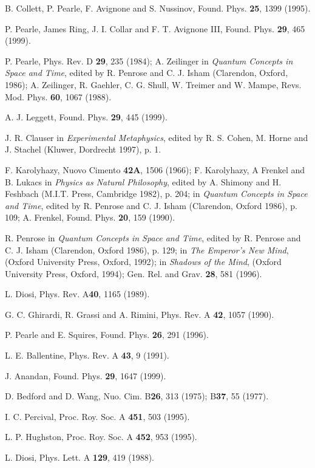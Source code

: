 \documentclass[12pt]{article}
\begin{document}
\begin{thebibliography}{99}
 B. Collett, P. Pearle, F. Avignone and S. Nussinov, Found. Phys. {\bf 25}, 1399 (1995).     

P. Pearle, James Ring, J. I. Collar and F. T.  Avignone III,
 Found. Phys. {\bf 29}, 465 (1999).

P. Pearle, Phys. Rev. D {\bf 29}, 235 (1984); A. Zeilinger in {\it Quantum Concepts 
in Space and Time}, edited by R. Penrose and C. J. 
Isham (Clarendon, Oxford, 1986); A. Zeilinger, R. Gaehler,
 C. G. Shull, W. Treimer and W. Mampe,  Revs. Mod. Phys. {\bf 60}, 1067 (1988). 

A. J.  Leggett, Found. Phys. {\bf 29}, 445 (1999).

J. R. Clauser in {\it Experimental Metaphysics}, edited by R. S. Cohen, 
M. Horne and J. Stachel (Kluwer, Dordrecht 1997), p. 1.

F. Karolyhazy, Nuovo Cimento {\bf42A}, 1506 (1966); 
F. Karolyhazy, A Frenkel and B. Lukacs in 
{\it Physics as Natural Philosophy}, edited by A. 
Shimony and H. Feshbach (M.I.T. Press, Cambridge 1982), p. 204; 
in {\it Quantum Concepts in Space and Time}, edited by R. Penrose and 
C. J. Isham (Clarendon, Oxford 1986), p. 109; A. Frenkel, Found. Phys. {\bf 20}, 159 (1990).

R. Penrose in {\it Quantum Concepts in Space and Time}, 
edited by R. Penrose and C. J. Isham (Clarendon, Oxford 1986), p. 129;  
in {\it The Emperor's New Mind}, (Oxford University Press, Oxford, 1992); in {\it 
Shadows of the Mind}, (Oxford University Press, Oxford, 1994); Gen. Rel. and Grav. {\bf 28}, 581 (1996).

L. Diosi, Phys. Rev. A{\bf 40}, 1165 (1989).

G. C. Ghirardi, R. Grassi and A. Rimini, Phys. Rev. A {\bf 42}, 1057 (1990).

P. Pearle and E. Squires, Found. Phys. {\bf 26}, 291 (1996).

L. E. Ballentine, Phys. Rev. A {\bf 43}, 9 (1991).

J. Anandan, Found. Phys. {\bf 29}, 1647 (1999).

D. Bedford and D. Wang, Nuo. Cim. B{\bf 26}, 313 (1975);  B{\bf 37}, 55 (1977). 

I. C. Percival, Proc. Roy. Soc. A {\bf 451}, 503 (1995).

L. P. Hughston, Proc. Roy. Soc. A {\bf 452}, 953 (1995).

L. Diosi, Phys. Lett. A  {\bf 129}, 419 (1988).

\end{thebibliography}
\end{document}
